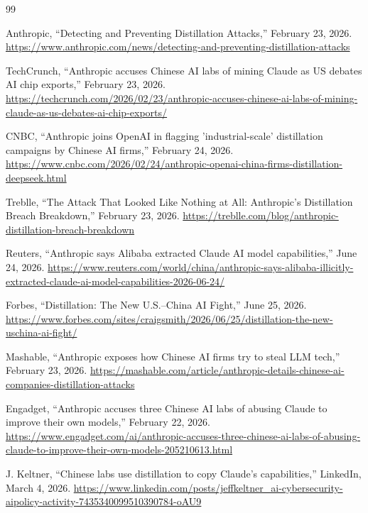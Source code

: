 \documentclass[11pt,a4paper]{article}
\begin{document}
\newpage
\begin{thebibliography}{99}
\sloppy

 Anthropic, ``Detecting and Preventing Distillation Attacks,'' February 23, 2026. \url{https://www.anthropic.com/news/detecting-and-preventing-distillation-attacks}

 TechCrunch, ``Anthropic accuses Chinese AI labs of mining Claude as US debates AI chip exports,'' February 23, 2026. \url{https://techcrunch.com/2026/02/23/anthropic-accuses-chinese-ai-labs-of-mining-claude-as-us-debates-ai-chip-exports/}

 CNBC, ``Anthropic joins OpenAI in flagging 'industrial-scale' distillation campaigns by Chinese AI firms,'' February 24, 2026. \url{https://www.cnbc.com/2026/02/24/anthropic-openai-china-firms-distillation-deepseek.html}

 Treblle, ``The Attack That Looked Like Nothing at All: Anthropic's Distillation Breach Breakdown,'' February 23, 2026. \url{https://treblle.com/blog/anthropic-distillation-breach-breakdown}

 Reuters, ``Anthropic says Alibaba extracted Claude AI model capabilities,'' June 24, 2026. \url{https://www.reuters.com/world/china/anthropic-says-alibaba-illicitly-extracted-claude-ai-model-capabilities-2026-06-24/}

 Forbes, ``Distillation: The New U.S.--China AI Fight,'' June 25, 2026. \url{https://www.forbes.com/sites/craigsmith/2026/06/25/distillation-the-new-uschina-ai-fight/}

 Mashable, ``Anthropic exposes how Chinese AI firms try to steal LLM tech,'' February 23, 2026. \url{https://mashable.com/article/anthropic-details-chinese-ai-companies-distillation-attacks}

 Engadget, ``Anthropic accuses three Chinese AI labs of abusing Claude to improve their own models,'' February 22, 2026. \url{https://www.engadget.com/ai/anthropic-accuses-three-chinese-ai-labs-of-abusing-claude-to-improve-their-own-models-205210613.html}

 J. Keltner, ``Chinese labs use distillation to copy Claude's capabilities,'' LinkedIn, March 4, 2026. \url{https://www.linkedin.com/posts/jeffkeltner_ai-cybersecurity-aipolicy-activity-7435340099510390784-oAU9}


\end{thebibliography}
\end{document}
